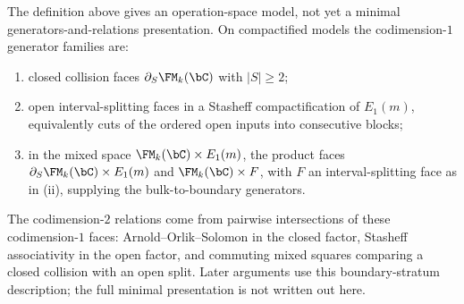 \begin{remark}
The definition above gives an operation-space model, not yet a
minimal generators-and-relations presentation. On compactified
models the codimension-$1$ generator families are:
\begin{enumerate}[label=\textup{(\roman*)}]
\item closed collision faces $\partial_S\FM_k(\bC)$ with $|S|\ge 2$;
\item open interval-splitting faces in a Stasheff compactification
 of $E_1(m)$, equivalently cuts of the ordered open inputs into
 consecutive blocks;
\item in the mixed space $\FM_k(\bC)\times E_1(m)$, the product
 faces $\partial_S\FM_k(\bC)\times E_1(m)$ and
 $\FM_k(\bC)\times F$, with $F$ an interval-splitting face as in
 \textup{(}ii\textup{)}, supplying the bulk-to-boundary generators.
\end{enumerate}
The codimension-$2$ relations come from pairwise intersections of
these codimension-$1$ faces: Arnold--Orlik--Solomon in the closed
factor, Stasheff associativity in the open factor, and commuting
mixed squares comparing a closed collision with an open split.
Later arguments use this boundary-stratum description; the full
minimal presentation is not written out here.
\end{remark}

